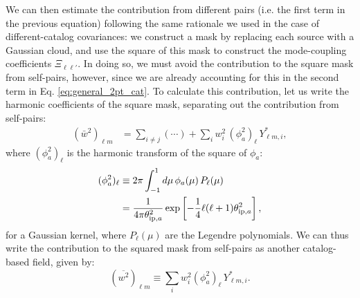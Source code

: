 \documentclass[aps,twocolumn, superscriptaddress, english, nofootinbib, 10pt]{revtex4-2}
\newcommand{\nv}{\hat{\bf n}}
\begin{document}
    We can then estimate the contribution from different pairs (i.e. the first term in the previous equation) following the same rationale we used in the case of different-catalog covariances: we construct a mask by replacing each source with a Gaussian cloud, and use the square of this mask to construct the mode-coupling coefficients $\Xi_{\ell\ell'}$. In doing so, we must avoid the contribution to the square mask from self-pairs, however, since we are already accounting for this in the second term in Eq. \ref{eq:general_2pt_cat}. To calculate this contribution, let us write the harmonic coefficients of the square mask, separating out the contribution from self-pairs:
    \begin{align}
      (\bar{w}^2)_{\ell m}
      &=\sum_{i\neq j}(\cdots)+\sum_i w_i^2\,(\phi^2_a)_\ell\,Y^*_{\ell m,i},
    \end{align}
    where $(\phi^2_a)_\ell$ is the harmonic transform of the square of $\phi_a$:
    \begin{align}
      (\phi^2_a)_\ell
      &\equiv 2\pi\int_{-1}^1 d\mu\,\phi_a(\mu)\,P_\ell(\mu)\\
      &=\frac{1}{4\pi\theta_{{\rm ip},a}^2}\exp\left[-\frac{1}{4}\ell(\ell+1)\theta_{{\rm ip},a}^2\right],
    \end{align}
    for a Gaussian kernel, where $P_\ell(\mu)$ are the Legendre polynomials. We can thus write the contribution to the squared mask from self-pairs as another catalog-based field, given by:
    \begin{equation}
      (\overline{w^2})_{\ell m}\equiv \sum_i w_i^2(\phi^2_a)_\ell\,Y^*_{\ell m,i}.
    \end{equation}
\end{document}
